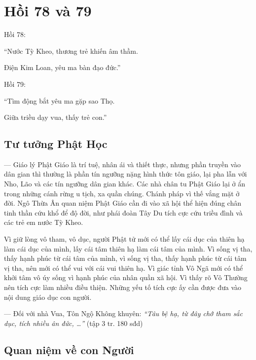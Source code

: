 \chapter{Hồi 78 và 79} %
\label{cha:hoi_78_79}

Hồi 78:

\begin{itshape}
``Nước Tỳ Kheo, thương trẻ khiến âm thầm.

Điện Kim Loan, yêu ma bàn đạo đức.''
\end{itshape}

Hồi 79:

\begin{itshape}
``Tìm động bắt yêu ma gặp sao Thọ.

Giữa triều dạy vua, thấy trẻ con.''
\end{itshape}

\section{Tư tưởng Phật Học} %
\label{sec:78_79_phat_hoc}

--- Giáo lý Phật Giáo là trí tuệ, nhân ái và thiết thực, nhưng phần truyền vào dân gian thì thường là phần tín ngưỡng nặng hình thức tôn giáo, lại pha lẫn với Nho, Lão và các tín ngưỡng dân gian khác. Các nhà chân tu Phật Giáo lại ở ẩn trong những cánh rừng u tịch, xa quần chúng. Chánh pháp vì thế vắng mặt ở đời. Ngô Thừa Ân quan niệm Phật Giáo cần đi vào xã hội thể hiện đúng chân tinh thần cứu khổ để độ đời, như phái đoàn Tây Du tích cực cứu triều đình và các trẻ em nước Tỳ Kheo.

Vì giữ lòng vô tham, vô dục, người Phật tử mới có thể lấy cái dục của thiên hạ làm cái dục của mình, lấy cái tâm thiên hạ làm cái tâm của mình. Vì sống vị tha, thấy hạnh phúc từ cái tâm của mình, vì sống vị tha, thấy hạnh phúc từ cái tâm vị tha, nên mới có thể vui với cái vui thiên hạ. Vì giác tỉnh Vô Ngã mới có thể khởi tâm vô úy sống vì hạnh phúc của nhân quần xã hội. Vì thấy rõ Vô Thường nên tích cực làm nhiều điều thiện. Những yếu tố tích cực ấy cần được đưa vào nội dung giáo dục con người.

--- Đối với nhà Vua, Tôn Ngộ Không khuyên: \emph{``Tâu bệ hạ, từ đây chớ tham sắc dục, tích nhiều ân đức, \ldots''} (tập 3 tr. 180 sđd)

\section{Quan niệm về con Người} %
\label{sec:78_79_con_nguoi}

